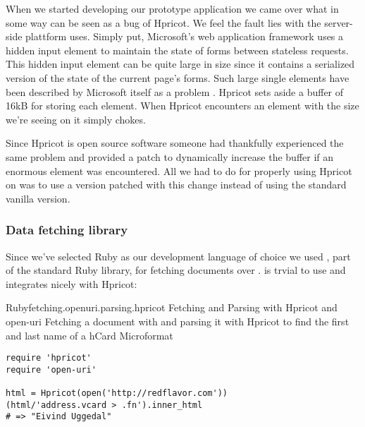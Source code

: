 When we started developing our prototype application we came over what in
some way can be seen as a bug of Hpricot. We feel the fault lies
with the server-side plattform \urort{} uses. Simply put, Microsoft's
 web application framework uses a hidden 
input element to maintain the state of  forms between
stateless  requests. This hidden input element can be quite large%
in size since it contains a serialized version of the state of the current
page's  forms. Such large single  elements have been
described by Microsoft itself as a problem \citep{mitchell04}.
Hpricot sets aside a buffer of 16kB for storing each  element.
When Hpricot encounters an element with the size we're seeing on \urort{}
it simply chokes.

Since Hpricot is open source software someone had thankfully experienced
the same problem and provided a patch to dynamically increase the
buffer if an enormous  element was encountered. All we had to do
for properly using Hpricot on \urort{} was to use a version patched with this
change instead of using the standard vanilla version.

\subsubsection{Data fetching library}

Since we've selected Ruby as our development language of choice we used
, part of the standard Ruby library, for fetching
documents over .
 is trvial to use and integrates nicely with Hpricot:

\begin{scode}{Ruby}{fetching.openuri.parsing.hpricot}{%
  Fetching and Parsing with Hpricot and open-uri}{%
  Fetching a  document with 
  and parsing it with Hpricot to find the first and
  last name of a hCard Microformat}
\begin{lstlisting}
require 'hpricot'
require 'open-uri'

html = Hpricot(open('http://redflavor.com'))
(html/'address.vcard > .fn').inner_html
# => "Eivind Uggedal"
\end{lstlisting}
\end{scode}

